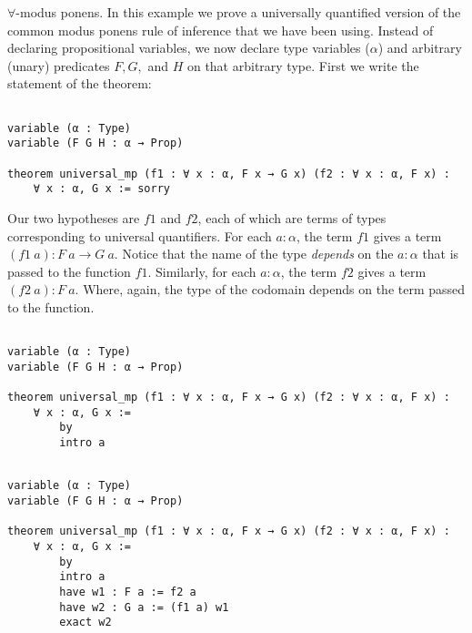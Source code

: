 \documentclass{book}
\begin{document}
\begin{eg}
$\forall$-modus ponens. In this example we prove a universally quantified version of the common modus ponens rule of inference that we have been using. Instead of declaring propositional variables, we now declare type variables ($\alpha$) and arbitrary (unary) predicates $F, G,$ and $H$ on that arbitrary type. First we write the statement of the theorem: 

\begin{center}
\begin{lstlisting}
    
variable (α : Type)
variable (F G H : α → Prop)

theorem universal_mp (f1 : ∀ x : α, F x → G x) (f2 : ∀ x : α, F x) :
    ∀ x : α, G x := sorry

\end{lstlisting}            
\end{center}

Our two hypotheses are $f1$ and $f2$, each of which are terms of types corresponding to universal quantifiers. For each $a : \alpha$, the term $f1$ gives a term $(f1 \ a) : F \ a \to G \ a$. Notice that the name of the type \emph{depends} on the $a : \alpha$ that is passed to the function $f1$. Similarly, for each $a : \alpha$, the term $f2$ gives a term $(f2 \ a) : F \ a$. Where, again, the type of the codomain depends on the term passed to the function. 


\begin{center}
\begin{lstlisting}
                
variable (α : Type)
variable (F G H : α → Prop)

theorem universal_mp (f1 : ∀ x : α, F x → G x) (f2 : ∀ x : α, F x) :
    ∀ x : α, G x :=
        by
        intro a
\end{lstlisting}            
\end{center}




\begin{center}
\begin{lstlisting}
    
variable (α : Type)
variable (F G H : α → Prop)

theorem universal_mp (f1 : ∀ x : α, F x → G x) (f2 : ∀ x : α, F x) :
    ∀ x : α, G x :=
        by
        intro a
        have w1 : F a := f2 a
        have w2 : G a := (f1 a) w1
        exact w2
\end{lstlisting}            
\end{center}
\end{eg}
\end{document}
